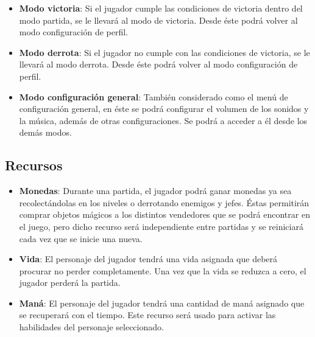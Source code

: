 \begin{itemize}
    \item \textbf{Modo victoria}: Si el jugador cumple las condiciones de
    victoria dentro del modo partida, se le llevará al modo de victoria. Desde
    éste podrá volver al modo configuración de perfil.

    \item \textbf{Modo derrota}: Si el jugador no cumple con las condiciones de
    victoria, se le llevará al modo derrota. Desde éste podrá volver al modo
    configuración de perfil.

    \item \textbf{Modo configuración general}: También considerado como el
    menú de configuración general, en éste se podrá configurar el volumen de
    los sonidos y la música, además de otras configuraciones. Se podrá a acceder
    a él desde los demás modos.
\end{itemize}

\subsection{Recursos}

\begin{itemize}
    \item \textbf{Monedas}: Durante una partida, el jugador podrá ganar monedas
    ya sea recolectándolas en los niveles o derrotando enemigos y jefes. Éstas
    permitirán comprar objetos mágicos a los distintos vendedores que se podrá
    encontrar en el juego, pero dicho recurso será independiente entre partidas
    y se reiniciará cada vez que se inicie una nueva.
    \item \textbf{Vida}: El personaje del jugador tendrá una vida asignada que
    deberá procurar no perder completamente. Una vez que la vida se reduzca a
    cero, el jugador perderá la partida.
    \item \textbf{Maná}: El personaje del jugador tendrá una cantidad de maná
    asignado que se recuperará con el tiempo. Este recurso será usado para
    activar las habilidades del personaje seleccionado.
\end{itemize}